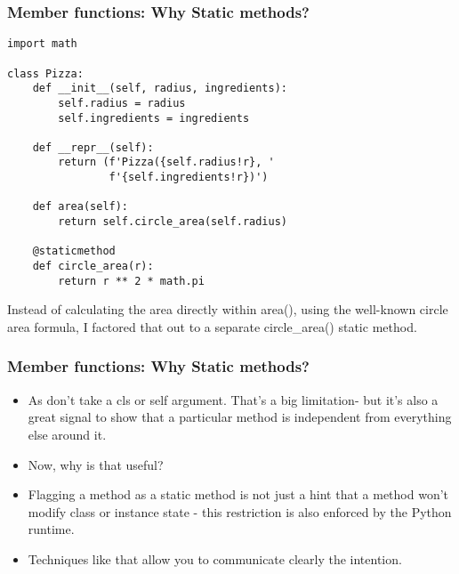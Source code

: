\begin{frame}[fragile]\frametitle{Member functions: Why Static methods?}

\begin{lstlisting}
import math

class Pizza:
    def __init__(self, radius, ingredients):
        self.radius = radius
        self.ingredients = ingredients

    def __repr__(self):
        return (f'Pizza({self.radius!r}, '
                f'{self.ingredients!r})')

    def area(self):
        return self.circle_area(self.radius)

    @staticmethod
    def circle_area(r):
        return r ** 2 * math.pi
\end{lstlisting}

Instead of calculating the area directly within area(), using the well-known circle area formula, I factored that out to a separate circle\_area() static method.

\end{frame}


\begin{frame}[fragile]\frametitle{Member functions: Why Static methods?}
   \begin{itemize}
  \item As don't take a cls or self argument. That's a big limitation- but it's also a great signal to show that a particular method is independent from everything else around it.
	\item Now, why is that useful?
	\item Flagging a method as a static method is not just a hint that a method won't modify class or instance state - this restriction is also enforced by the Python runtime.
	\item Techniques like that allow you to communicate clearly the intention.
  \end{itemize}

\end{frame}



